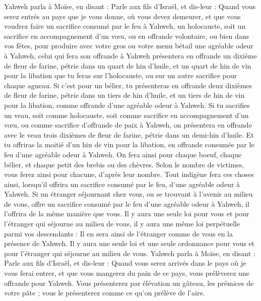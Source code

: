 \begin{multicols}{2}
\VerseOne{}Yahweh parla à Moïse, en disant :
Parle aux fils d'Israël, et dis-leur : Quand vous serez entrés au pays que je vous donne, où vous devez demeurer,
et que vous voudrez faire un sacrifice consumé par le feu à Yahweh, un holocauste, soit un sacrifice en accompagnement d'un vœu, ou en offrande volontaire, ou bien dans vos fêtes, pour produire avec votre gros ou votre menu bétail une agréable odeur à Yahweh,
celui qui fera son offrande à Yahweh présentera en offrande un dixième de fleur de farine, pétrie dans un quart de hin d'huile,
et un quart de hin de vin pour la libation que tu feras sur l'holocauste, ou sur un autre sacrifice pour chaque agneau.
Si c'est pour un bélier, tu présenteras en offrande deux dixièmes de fleur de farine, pétrie dans un tiers de hin d'huile,
et un tiers de hin de vin pour la libation, comme offrande d'une agréable odeur à Yahweh.
Si tu sacrifies un veau, soit comme holocauste, soit comme sacrifice en accompagnement d'un vœu, ou comme sacrifice d'offrande de paix à Yahweh,
on présentera en offrande avec le veau trois dixièmes de fleur de farine, pétrie dans un demi-hin d'huile.
Et tu offriras la moitié d'un hin de vin pour la libation, en offrande consumée par le feu d'une agréable odeur à Yahweh.
On fera ainsi pour chaque boeuf, chaque bélier, et chaque petit des brebis ou des chèvres.
Selon le nombre de victimes, vous ferez ainsi pour chacune, d'après leur nombre.
Tout indigène fera ces choses ainsi, lorsqu'il offrira un sacrifice consumé par le feu, d'une agréable odeur à Yahweh.
Si un étranger séjournant chez vous, ou se trouvant à l'avenir au milieu de vous, offre un sacrifice consumé par le feu d'une agréable odeur à Yahweh, il l'offrira de la même manière que vous.
Il y aura une seule loi pour vous et pour l'étranger qui séjourne au milieu de vous, il y aura une même loi perpétuelle parmi vos descendants : Il en sera ainsi de l'étranger comme de vous en la présence de Yahweh.
Il y aura une seule loi et une seule ordonnance pour vous et pour l'étranger qui séjourne au milieu de vous.
Yahweh parla à Moïse, en disant :
Parle aux fils d'Israël, et dis-leur : Quand vous serez arrivés dans le pays où je vous ferai entrer,
et que vous mangerez du pain de ce pays, vous prélèverez une offrande pour Yahweh.
Vous présenterez par élévation un gâteau, les prémices de votre pâte ; vous le présenterez comme ce qu'on prélève de l'aire.

\end{multicols}
